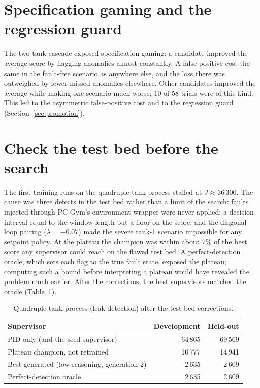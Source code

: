 \section{Specification gaming and the regression guard}
\label{sec:tank-gaming}
The two-tank cascade exposed specification gaming: a candidate
improved the average score by flagging anomalies almost constantly. A false
positive cost the same in the fault-free scenario as anywhere else, and the
loss there was outweighed by fewer missed anomalies elsewhere. Other
candidates improved the average while making one scenario much worse; 10 of
58 trials were of this kind. This led to the asymmetric false-positive cost
and to the regression guard (Section~\ref{sec:promotion}).

\section{Check the test bed before the search}
\label{sec:tank-testbed-check}
The first training runs on the quadruple-tank process stalled at
$J \approx 36\,300$. The cause was three defects in the test bed rather than
a limit of the search: faults injected through PC-Gym's environment wrapper
were never applied; a decision interval equal to the window length put a
floor on the score; and the diagonal loop pairing ($\lambda = -0.07$) made the
severe tank-1 scenario impossible for any setpoint policy. At the plateau the
champion was within about 7\% of the best score any supervisor could reach on
the flawed test bed. A perfect-detection oracle, which sets each flag to the
true fault state, exposed the plateau; computing such a bound before
interpreting a plateau would have revealed the problem much earlier. After
the corrections, the best supervisors matched the oracle
(Table~\ref{tab:four}).

\begin{table}[tb]
  \centering
  \caption{Quadruple-tank process (leak detection) after the test-bed
    corrections.}
  \label{tab:four}
  \begin{tabular}{@{}lrr@{}}
    \toprule
    Supervisor & Development & Held-out \\
    \midrule
    PID only (and the seed supervisor)          & 64\,865 & 69\,569 \\
    Plateau champion, not retrained             & 10\,777 & 14\,941 \\
    Best generated (low reasoning, generation 2) &  2\,635 &  2\,609 \\
    Perfect-detection oracle                    &  2\,635 &  2\,609 \\
    \bottomrule
  \end{tabular}
\end{table}

